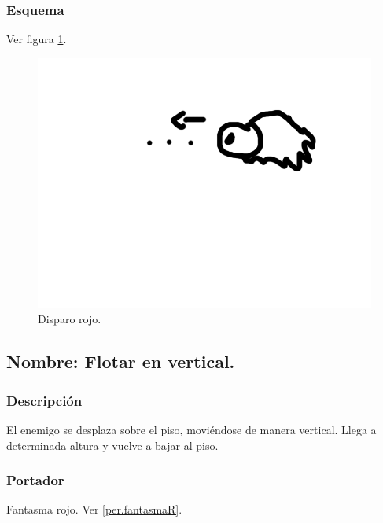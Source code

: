 \documentclass[11pt,letterpaper]{article}
\begin{document}
		\subsubsection{Esquema}
		Ver figura \ref{fig:disparoR}.
		\begin{figure}
			\centering
			\includegraphics[height=0.2 \textheight]{Imagenes/disparoR}
			\caption{Disparo rojo.}
			\label{fig:disparoR}
		\end{figure}
	\subsection{Nombre: Flotar en vertical.} \label{hab.flotarV}
		\subsubsection{Descripción}
		El enemigo se desplaza sobre el piso, moviéndose de manera vertical. Llega a determinada altura y vuelve a bajar al piso.
		\subsubsection{Portador}
		Fantasma rojo. Ver \ref{per.fantasmaR}.
\end{document}
